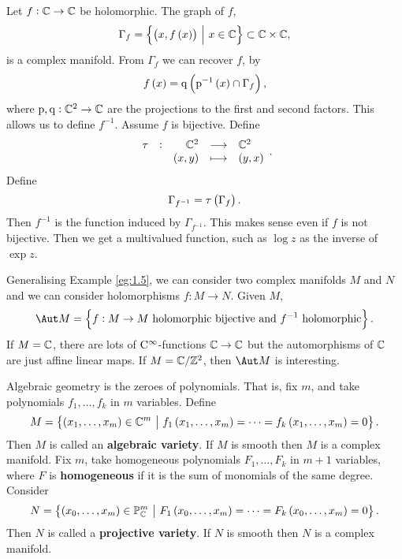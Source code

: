 \begin{example}
\label{eg:1.5}
Let $ f : \mathbb{C} \to \mathbb{C} $ be holomorphic. The graph of $ f $,
$$ \Gamma_f = \cbr{\br{x, f\br{x}} \st x \in \CC} \subset \CC \times \CC, $$
is a complex manifold. From $ \Gamma_f $ we can recover $ f $, by
$$ f\br{x} = \q\br{\p^{-1}\br{x} \cap \Gamma_f}, $$
where $ \mathrm{p}, \mathrm{q} : \mathbb{C}^2 \to \mathbb{C} $ are the projections to the first and second factors. This allows us to define $ f^{-1} $. Assume $ f $ is bijective. Define
$$ \function[\tau]{\CC^2}{\CC^2}{\br{x, y}}{\br{y, x}}. $$
Define
$$ \Gamma_{f^{-1}} = \tau\br{\Gamma_f}. $$
Then $ f^{-1} $ is the function induced by $ \Gamma_{f^{-1}} $. This makes sense even if $ f $ is not bijective. Then we get a multivalued function, such as $ \log z $ as the inverse of $ \exp z $.
\end{example}

\begin{example}
Generalising Example \ref{eg:1.5}, we can consider two complex manifolds $ M $ and $ N $ and we can consider holomorphisms $ f : M \to N $. Given $ M $,
$$ \Aut M = \cbr{f : M \to M \ \text{holomorphic bijective and} \ f^{-1} \ \text{holomorphic}}. $$
If $ M = \mathbb{C} $, there are lots of $ \mathrm{C}^\infty $-functions $ \mathbb{C} \to \mathbb{C} $ but the automorphisms of $ \mathbb{C} $ are just affine linear maps. If $ M = \mathbb{C} / \mathbb{Z}^2 $, then $ \Aut M $ is interesting.
\end{example}

\begin{example}
Algebraic geometry is the zeroes of polynomials. That is, fix $ m $, and take polynomials $ f_1, \dots, f_k $ in $ m $ variables. Define
$$ M = \cbr{\br{x_1, \dots, x_m} \in \CC^m \st f_1\br{x_1, \dots, x_m} = \dots = f_k\br{x_1, \dots, x_m} = 0}. $$
Then $ M $ is called an \textbf{algebraic variety}. If $ M $ is smooth then $ M $ is a complex manifold. Fix $ m $, take homogeneous polynomials $ F_1, \dots, F_k $ in $ m + 1 $ variables, where $ F $ is \textbf{homogeneous} if it is the sum of monomials of the same degree. Consider
$$ N = \cbr{\br{x_0, \dots, x_m} \in \PP_\CC^m \st F_1\br{x_0, \dots, x_m} = \dots = F_k\br{x_0, \dots, x_m} = 0}. $$
Then $ N $ is called a \textbf{projective variety}. If $ N $ is smooth then $ N $ is a complex manifold.
\end{example}

\pagebreak

